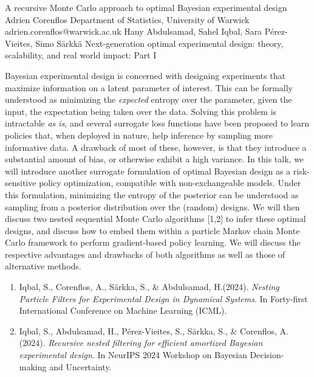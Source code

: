 \begin{talk}
  {A recursive Monte Carlo approach to optimal Bayesian experimental design}%
  {Adrien Corenflos}%
  {Department of Statistics, University of Warwick}%
  {adrien.corenflos@warwick.ac.uk}%
  {Hany Abdulsamad, Sahel Iqbal, Sara P\'erez-Vieites, Simo S\"arkk\"a}%
  {Next-generation optimal experimental design: theory, scalability, and real world impact: Part I}%
    
   
    Bayesian experimental design is concerned with designing experiments that maximize information on a latent parameter of interest. 
    This can be formally understood as minimizing the \emph{expected} entropy over the parameter, given the input, the expectation being taken over the data.
    Solving this problem is intractable \emph{as is}, and several surrogate loss functions have been proposed to learn policies that, when deployed in nature, help inference by sampling more informative data.
    A drawback of most of these, however, is that they introduce a substantial amount of bias, or otherwise exhibit a high variance.
    In this talk, we will introduce another surrogate formulation of optimal Bayesian design as a risk-sensitive policy optimization, compatible with non-exchangeable models.
    Under this formulation, minimizing the entropy of the posterior can be understood as sampling from a posterior distribution over the (random) designs.
    We will then discuss two nested sequential Monte Carlo algorithms [1,2] to infer these optimal designs, and discuss how to embed them within a particle Markov chain Monte Carlo framework to perform gradient-based policy learning. 
    We will discuss the respective advantages and drawbacks of both algorithms as well as those of alternative methods.
\medskip


\begin{enumerate}
 \item[{[1]}]Iqbal, S., Corenflos, A., S\"arkka, S., \&  Abdulsamad, H.(2024). {\it Nesting Particle Filters for Experimental Design in Dynamical Systems}. In Forty-first International Conference on Machine Learning (ICML).
 \item[{[2]}] Iqbal, S., Abdulsamad, H., P\'erez-Vieites, S., S\"arkka, S., \& Corenflos, A. (2024). {\it Recursive nested filtering for efficient amortized Bayesian experimental design}. In NeurIPS 2024 Workshop on Bayesian Decision-making and Uncertainty.
\end{enumerate}

\end{talk}

